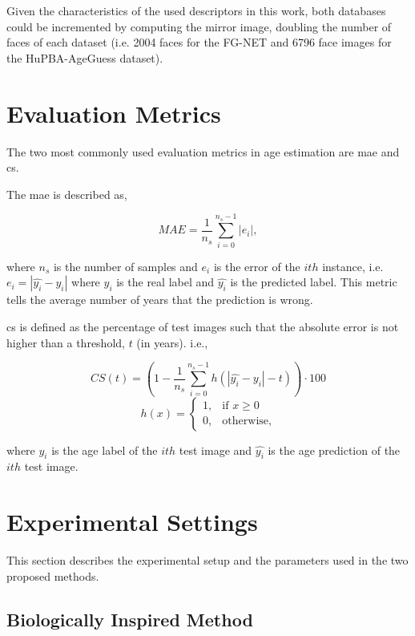 Given the characteristics of the used descriptors in this work, both databases could be incremented by computing the mirror image, doubling the number of faces of each dataset (i.e. 2004 faces for the FG-NET and 6796 face images for the HuPBA-AgeGuess dataset).

\section{Evaluation Metrics} 

The two most commonly used evaluation metrics in age estimation are \acrfull{mae} and \gls{cs}.

The \gls{mae} is described as,

\begin{equation}
MAE = \frac{1}{n_{s}}\sum_{i=0}^{n_{s}-1} |e_i|,
\end{equation}

where $n_s$ is the number of samples and $e_i$ is the error of the $ith$ instance, i.e. $e_i = |\hat{y_i} - y_i|$ where $y_i $ is the real label and $\hat{y_i}$ is the predicted label. This metric tells the average number of years that the prediction is wrong.

\gls{cs} is defined as the percentage of test images such that the absolute error is not higher than a threshold, $t$ (in years). i.e.,

\begin{equation}
CS(t) = (1 - \frac{1}{n_{s}}\sum_{i=0}^{n_{s}-1} h(|\hat{y_i} - y_i| - t))\cdot 100
\end{equation}
\begin{equation}
h(x) = 
\begin{cases}
1,				& \text{if } x \geq 0\\
0,              & \text{otherwise},
\end{cases}
\end{equation}

where $y_i$ is the age label of the $ith$ test image and $\hat{y_i}$ is the age prediction of the $ith$ test image.
 

\section{Experimental Settings}
This section describes the experimental setup and the parameters used in the two proposed methods.

\subsection{Biologically Inspired Method}

